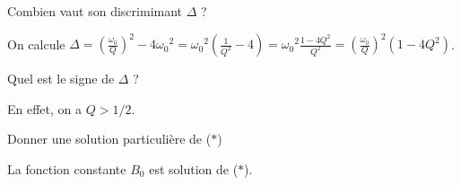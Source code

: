 





\begin{enonce}
Combien vaut son discrimimant $\Delta$ ?
\end{enonce}


\begin{corrige}
On calcule $\Delta = \left (\frac{\omega_0}{Q} \right )^2 - 4{\omega_0}^2 
= {\omega_0}^2 \left ( \frac{1}{Q^2}-4\right ) 
={\omega_0}^2 \frac{1-4Q^2}{Q^2} 
=\left (\frac{\omega_0}{Q} \right )^2 (1-4Q^2)$. 
\end{corrige}




\begin{enonce}
Quel est le signe de $\Delta$ ?
\end{enonce}


\begin{corrige}
En effet, on a $Q >1/2$.
\end{corrige}





\begin{enonce}
Donner une solution particulière de ($\ast$)
\end{enonce}


\begin{corrige}
La fonction constante $B_0$ est solution de ($\ast$).
\end{corrige}

